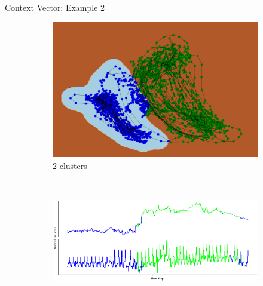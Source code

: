 \documentclass{beamer}
\begin{document}
\begin{frame}[shrink]{Context Vector: Example 2}
\begin{figure}[H]
	\centering
	\begin{subfigure}[b]{0.35\textwidth}
		\includegraphics[width=\textwidth]{ex2_pca_cluster_2.png}
		\caption{\(2\) clusters}
		\label{fig:ex2_pca_cluster_2}
	\end{subfigure}
	~
	\begin{subfigure}[b]{0.6\textwidth}
		\includegraphics[width=\textwidth]{ex2_context_timeline_2.png}
		\label{fig:ex2_context_timeline_2}
	\end{subfigure}
	

\end{figure}
\end{frame}
\end{document}
